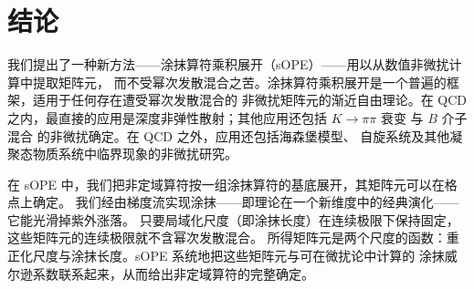 \section{结论}

我们提出了一种新方法——涂抹算符乘积展开（sOPE）——用以从数值非微扰计算中提取矩阵元，
而不受幂次发散混合之苦。涂抹算符乘积展开是一个普遍的框架，适用于任何存在遭受幂次发散混合的
非微扰矩阵元的渐近自由理论。在 QCD 之内，最直接的应用是深度非弹性散射；其他应用还包括
$K\rightarrow \pi\pi$ 衰变 \cite{Dawson:1997ic,Detmold:2005gg} 与 $B$
介子混合 \cite{Monahan:2014xra} 的非微扰确定。在 QCD 之外，应用还包括海森堡模型、
自旋系统及其他凝聚态物质系统中临界现象的非微扰研究。

在 sOPE 中，我们把非定域算符按一组涂抹算符的基底展开，其矩阵元可以在格点上确定。
我们经由梯度流实现涂抹——即理论在一个新维度中的经典演化——它能光滑掉紫外涨落。
只要局域化尺度（即涂抹长度）在连续极限下保持固定，这些矩阵元的连续极限就不含幂次发散混合。
所得矩阵元是两个尺度的函数：重正化尺度与涂抹长度。sOPE 系统地把这些矩阵元与可在微扰论中计算的
涂抹威尔逊系数联系起来，从而给出非定域算符的完整确定。
